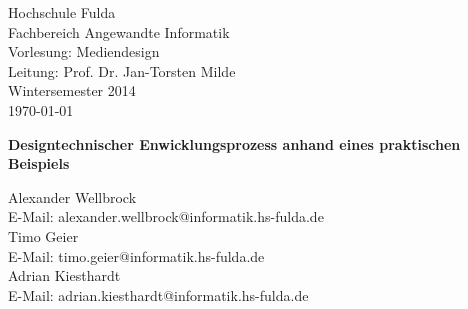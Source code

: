 
\begin{titlepage}

	\begin{small}
		\vfill {Hochschule Fulda\\
		Fachbereich Angewandte Informatik\\ 
		Vorlesung: Mediendesign\\
		Leitung: Prof. Dr. Jan-Torsten Milde\\
		Wintersemester 2014 \\
		\today}
	\end{small}

	\begin{center}
		\begin{Large}
			\vfill {\textsf{\textbf{
			Designtechnischer Enwicklungsprozess anhand eines praktischen Beispiels
			}}}
		\end{Large}
	\end{center}

	\begin{small}
		\vfill Alexander Wellbrock\\ E-Mail: alexander.wellbrock@informatik.hs-fulda.de\\
		Timo Geier\\ E-Mail: timo.geier@informatik.hs-fulda.de\\
		Adrian Kiesthardt\\ E-Mail: adrian.kiesthardt@informatik.hs-fulda.de
	\end{small}

\end{titlepage}